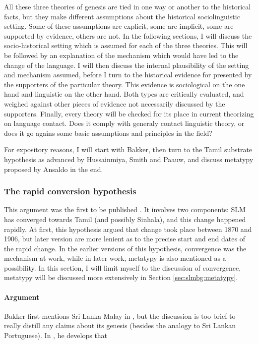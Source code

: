 All these three theories of genesis are tied in one way or another to the historical facts, but they make different assumptions about the historical sociolinguistic setting. Some of these assumptions are explicit, some are implicit, some are supported by evidence, others are not. In the following sections, I will discuss the socio-historical setting which is assumed for each of the three theories. This will be followed by an explanation of the mechanism which would have led to the change of the language.  I will then discuss the internal plausibility of the setting and mechanism assumed, before I turn to the  historical evidence for presented by the supporters of the particular theory. This evidence is sociological on the one hand and linguistic on the other hand. Both types are critically evaluated, and weighed against other pieces of evidence not necessarily discussed by the supporters. Finally, every theory will be checked for its place in current theorizing on language contact. Does it comply with generaly contact linguistic theory, or does it go agains some basic assumptions and principles in the field?

For expository reasons, I will start with Bakker,  then turn to the Tamil substrate hypothesis as advanced by Hussainmiya, Smith and Paauw, and discuss metatypy proposed by Ansaldo in the end.

\subsubsection{The rapid conversion hypothesis}
This argument was the first to be published \citep{Bakker1996stuf}. It involves two components: SLM has converged towards Tamil (and possibly Sinhala), and this change happened rapidly. At first, this hypothesis argued that change took place between 1870 and 1906, but later version \citep{Bakker2006} are more lenient as to the precise start and end dates of the rapid change. In the earlier versions of this hypothesis, convergence was the mechanism at work, while in later work, metatypy is also mentioned as a possibility. In this section, I will limit myself to the discussion of convergence, metatypy will be discussed more extensively in Section \ref{sec:slmbg:metatypy}.

\paragraph{Argument}
Bakker first mentions Sri Lanka Malay in \citep[17f]{Bakker1996stuf}, but the discussion is too brief to really distill any claims about its genesis (besides the analogy to Sri Lankan Portuguese). In \citet{Bakker2000rapid,Bakker2000convergence}, he develops that

